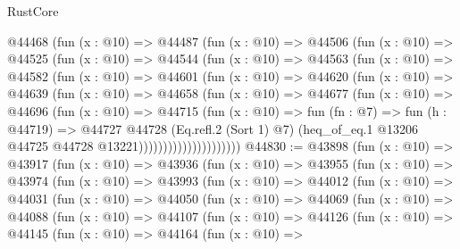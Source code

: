 \begin{lexlean}{RustCore}
\begin{coremodule}
              @44468
                (fun (x : @10) =>
                @44487
                  (fun (x : @10) =>
                  @44506
                    (fun (x : @10) =>
                    @44525
                      (fun (x : @10) =>
                      @44544
                        (fun (x : @10) =>
                        @44563
                          (fun (x : @10) =>
                          @44582
                            (fun (x : @10) =>
                            @44601
                              (fun (x : @10) =>
                              @44620
                                (fun (x : @10) =>
                                @44639
                                  (fun (x : @10) =>
                                  @44658
                                    (fun (x : @10) =>
                                    @44677
                                      (fun (x : @10) =>
                                      @44696
                                        (fun (x : @10) =>
                                        @44715
                                          (fun (x : @10) =>
                                          fun (fn : @7) =>
                                          fun (h : @44719) =>
                                          @44727
                                            @44728
                                            (Eq.refl.{2} (Sort 1) @7)
                                            (heq_of_eq.{1}
                                              @13206
                                              @44725
                                              @44728
                                              @13221)))))))))))))))))))))
@44830 := @43898
    (fun (x : @10) =>
    @43917
      (fun (x : @10) =>
      @43936
        (fun (x : @10) =>
        @43955
          (fun (x : @10) =>
          @43974
            (fun (x : @10) =>
            @43993
              (fun (x : @10) =>
              @44012
                (fun (x : @10) =>
                @44031
                  (fun (x : @10) =>
                  @44050
                    (fun (x : @10) =>
                    @44069
                      (fun (x : @10) =>
                      @44088
                        (fun (x : @10) =>
                        @44107
                          (fun (x : @10) =>
                          @44126
                            (fun (x : @10) =>
                            @44145
                              (fun (x : @10) =>
                              @44164
                                (fun (x : @10) =>

\end{coremodule}
\end{lexlean}
